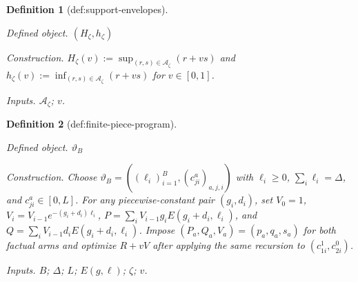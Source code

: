 \documentclass{article}
\newtheorem{definition}{Definition}
\begin{document}
\begin{definition}[def:support-envelopes]\label{def:support-envelopes}
\par\smallskip\noindent\emph{Defined object.} \((H_{\zeta},h_{\zeta})\)
\par\smallskip\noindent\emph{Construction.} \(H_{\zeta}(v):=\sup_{(r,s)\in\mathcal A_{\zeta}}(r+vs)\) and \(h_{\zeta}(v):=\inf_{(r,s)\in\mathcal A_{\zeta}}(r+vs)\) for \(v\in[0,1]\).
\par\smallskip\noindent\emph{Inputs.} \(\mathcal A_{\zeta}\); \(v\).
\end{definition}

\begin{definition}[def:finite-piece-program]\label{def:finite-piece-program}
\par\smallskip\noindent\emph{Defined object.} \(\vartheta_B\)
\par\smallskip\noindent\emph{Construction.} Choose \(\vartheta_B=((\ell_i)_{i=1}^B,(c_{ji}^a)_{a,j,i})\) with \(\ell_i\ge0\), \(\sum_i\ell_i=\Delta\), and \(c_{ji}^a\in[0,L]\). For any piecewise-constant pair \((g_i,d_i)\), set \(V_0=1\), \(V_i=V_{i-1}e^{-(g_i+d_i)\ell_i}\), \(P=\sum_iV_{i-1}g_iE(g_i+d_i,\ell_i)\), and \(Q=\sum_iV_{i-1}d_iE(g_i+d_i,\ell_i)\). Impose \((P_a,Q_a,V_a)=(p_a,q_a,s_a)\) for both factual arms and optimize \(R+vV\) after applying the same recursion to \((c_{1i}^1,c_{2i}^0)\).
\par\smallskip\noindent\emph{Inputs.} \(B\); \(\Delta\); \(L\); \(E(g,\ell)\); \(\zeta\); \(v\).
\end{definition}
\end{document}
